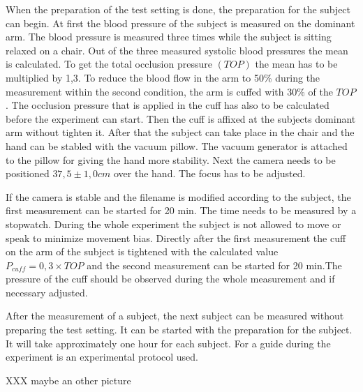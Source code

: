 When the preparation of the test setting is done, the preparation for the subject can begin. At first the blood pressure of the subject is measured on the dominant arm. The blood pressure is measured three times while the subject is sitting relaxed on a chair. Out of the three measured systolic blood pressures the mean is calculated. To get the total occlusion pressure $(TOP)$ the mean has to be multiplied by 1,3. To reduce the blood flow in the arm to 50\% during the measurement within the second condition, the arm is cuffed with 30\% of the $TOP$ \cite{mouser2017}. The occlusion pressure that is applied in the cuff has also to be calculated before the experiment can start.
Then the cuff is affixed at the subjects dominant arm without tighten it. After that the subject can take place in the chair and the hand can be stabled with the vacuum pillow. The vacuum generator is attached to the pillow for giving the hand more stability. Next the camera needs to be positioned $37,5\pm 1,0 cm$ over the hand. The focus has to be adjusted. 

If the camera is stable and the filename is modified according to the subject, the first measurement can be started for 20 min. The time needs to be measured by a stopwatch. During the whole experiment the subject is not allowed to move or speak to minimize movement bias.
Directly after the first measurement the cuff on the arm of the subject is tightened with the calculated value $P_{cuff}=0,3\times TOP$ and the second measurement can be started for 20 min.The pressure of the cuff should be observed during the whole measurement and if necessary adjusted.

After the measurement of a subject, the next subject can be measured without preparing the test setting. It can be started with the preparation for the subject. It will take approximately one hour for each subject. For a guide during the experiment is an experimental protocol used.

XXX maybe an other picture
